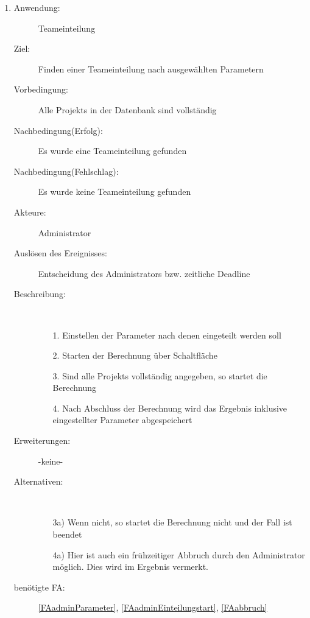 \documentclass[parskip=full]{scrartcl}
\newcommand{\swtLabel}[1]{\textbf{/#1\arabic*0/}}
\begin{document}
\begin{enumerate} [label=\swtLabel{A}]
  
  \item \label{UCadminEinteilungStart}
  \begin{description}
  \item[Anwendung:] Teameinteilung
  \item[Ziel:] Finden einer Teameinteilung nach ausgewählten Parametern
  	\item[Vorbedingung:] Alle \glspl{Projekt} in der Datenbank sind vollständig
  	\item[Nachbedingung(Erfolg):] Es wurde eine Teameinteilung gefunden
  	\item[Nachbedingung(Fehlschlag):] Es wurde keine Teameinteilung gefunden
  	\item[Akteure:] Administrator
  	\item[Auslösen des Ereignisses:] Entscheidung des Administrators bzw.
  	zeitliche Deadline
  	\item[Beschreibung:]~
  	\begin{enumerate} 
  	  \item[1.] Einstellen der Parameter nach denen eingeteilt werden soll
  	  \item[2.] Starten der Berechnung über Schaltfläche
  	  \item[3.] Sind alle \glspl{Projekt} vollständig angegeben, so startet die
  	  Berechnung
  	  \item[4.] Nach Abschluss der Berechnung wird das Ergebnis inklusive
  	  eingestellter Parameter abgespeichert
  	\end{enumerate}
  	\item[Erweiterungen:] -keine-
  	\item[Alternativen:] ~
  	\begin{enumerate}
  	  \item[3a)] Wenn nicht, so startet die Berechnung nicht und der Fall ist
  	  beendet
  	  \item[4a)] Hier ist auch ein frühzeitiger Abbruch durch den Administrator
  	  möglich. Dies wird im Ergebnis vermerkt.
  	 \end{enumerate}  
  	 \item[benötigte FA:] \ref{FAadminParameter},
  	 \ref{FAadminEinteilungstart}, \ref{FAabbruch}
  \end{description}
   

\end{enumerate}
\end{document}
